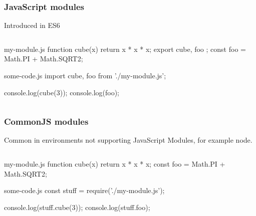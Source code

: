 \begin{frame}[fragile] \frametitle{JavaScript modules}
  Introduced in ES6
\begin{columns}[onlytextwidth]
  \begin{column}{1\textwidth}
\begin{CodeBox}{my-module.js}
function cube(x) {
  return x * x * x;
}
export { cube, foo };
const foo = Math.PI + Math.SQRT2;
\end{CodeBox}
\begin{CodeBox}{some-code.js}
import { cube, foo } from './my-module.js';

console.log(cube(3));
console.log(foo);
\end{CodeBox}
  \end{column}
\end{columns}%
\end{frame}

\begin{frame}[fragile] \frametitle{CommonJS modules}
  Common in environments not supporting JavaScript Modules, for example node.
\begin{columns}[onlytextwidth]
  \begin{column}{1\textwidth}
\begin{CodeBox}{my-module.js}
function cube(x) {
  return x * x * x;
}
const foo = Math.PI + Math.SQRT2;
\end{CodeBox}
\begin{CodeBox}{some-code.js}
const stuff = require('./my-module.js');

console.log(stuff.cube(3));
console.log(stuff.foo);
\end{CodeBox}
  \end{column}
\end{columns}%
\end{frame}

